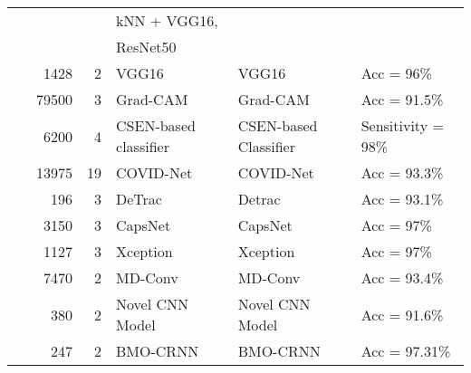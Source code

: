 \begin{table}[htbp]
\begin{center}
\begin{adjustbox}{angle=90}
\begin{tabular}{|l|r|r|l|l|l|}
  &   &      &   kNN + VGG16,  &    &    \\

  &   &      &    ResNet50 &    &    \\
\hline
~\cite{47pandit2021automatic}& 1428 &    2 &  VGG16 & VGG16 &  Acc = 96\% \\
\hline
~\cite{48arias2020artificial} &    79500 &    3 &   Grad-CAM &  Grad-CAM &    Acc = 91.5\% \\
\hline
~\cite{49yamac2021convolutional} & 6200 &    4 &  CSEN-based classifier & CSEN-based Classifier &    Sensitivity = 98\% \\
\hline
~\cite{50wang2020covid} &    13975 &   19 &  COVID-Net & COVID-Net &    Acc = 93.3\% \\
\hline
~\cite{51abbas2021classification} &  196 &    3 & DeTrac &    Detrac &    Acc = 93.1\% \\
\hline
~\cite{52toraman2020convolutional} & 3150 &    3 &    CapsNet &   CapsNet &  Acc = 97\% \\
\hline
~\cite{53das2022automated} & 1127 &    3 &   Xception &  Xception &  Acc = 97\% \\
\hline
~\cite{54hu2020learning} & 7470 &    2 &    MD-Conv &   MD-Conv &    Acc = 93.4\% \\
\hline
~\cite{55ismael2021deep} &  380 &    2 &    Novel CNN Model &   Novel CNN Model &    Acc = 91.6\% \\
\hline
~\cite{56shankar2021optimal} &  247 &    2 &   BMO-CRNN &  BMO-CRNN &  Acc = 97.31\% \\
\hline
\end{tabular}
\end{adjustbox}
\end{center}
\end{table}
